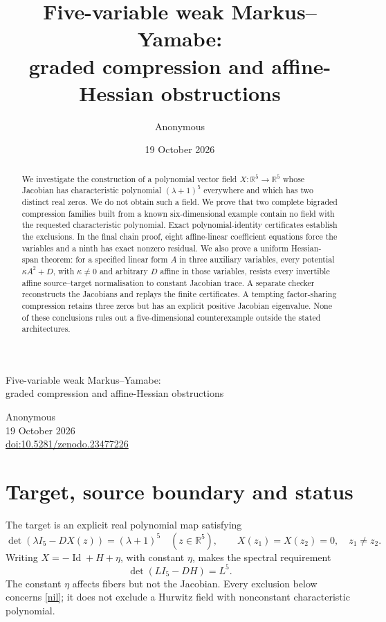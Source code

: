\documentclass[11pt,a4paper]{article}
\title{\color{ink}Five-variable weak Markus--Yamabe:\\graded compression and affine-Hessian obstructions}
\author{Anonymous}\date{19 October 2026}
\theoremstyle{remark}\newtheorem{remark}[theorem]{Remark}
\newcommand{\R}{\mathbb R}\newcommand{\Q}{\mathbb Q}\newcommand{\Id}{\operatorname{Id}}\newcommand{\tr}{\operatorname{tr}}\newcommand{\Hess}{\operatorname{Hess}}
\begin{document}
\thispagestyle{plain}
\begin{center}
\vspace*{3mm}
{\LARGE\color{ink}Five-variable weak Markus--Yamabe:\\[2mm]
graded compression and affine-Hessian obstructions\par}
\vspace{6mm}
Anonymous\\[2mm]
19 October 2026\\[1mm]
\href{https://doi.org/10.5281/zenodo.23477226}{doi:10.5281/zenodo.23477226}
\end{center}
\vspace{2mm}
\begin{abstract}
We investigate the construction of a polynomial vector field $X:\R^5\to\R^5$
whose Jacobian has characteristic polynomial $(\lambda+1)^5$ everywhere and which
has two distinct real zeros. We do not obtain such a field. We prove that two
complete bigraded compression families built from a known six-dimensional
example contain no field with the requested characteristic polynomial. Exact
polynomial-identity certificates establish the exclusions. In the final chain
proof, eight affine-linear coefficient equations force the variables and a
ninth has exact nonzero residual. We also prove a uniform
Hessian-span theorem: for a specified linear form $A$ in three auxiliary
variables, every potential $\kappa A^2+D$, with $\kappa\ne0$ and arbitrary
$D$ affine in those variables, resists every invertible affine source--target
normalisation to constant Jacobian trace. A separate checker reconstructs the
Jacobians and replays the finite certificates. A tempting factor-sharing
compression retains three zeros but has an explicit positive Jacobian eigenvalue.
None of these conclusions rules out a five-dimensional counterexample outside
the stated architectures.
\end{abstract}

\section{Target, source boundary and status}
The target is an explicit real polynomial map satisfying
\begin{equation}\label{target}
 \det(\lambda I_5-DX(z))=(\lambda+1)^5\quad(z\in\R^5),
 \qquad X(z_1)=X(z_2)=0,\quad z_1\ne z_2.
\end{equation}
Writing $X=-\Id+H+\eta$, with constant $\eta$, makes the spectral requirement
\begin{equation}\label{nil}
 \det(LI_5-DH)=L^5.
\end{equation}
The constant $\eta$ affects fibers but not the Jacobian. Every exclusion below
concerns \eqref{nil}; it does not exclude a Hurwitz field with nonconstant
characteristic polynomial.
\end{document}
